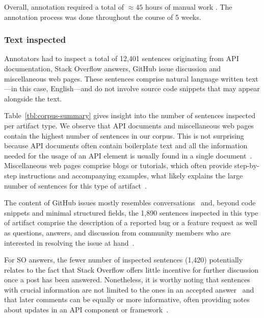 Overall, annotation required a total of $\approx45$ hours of manual work .
The annotation process was done throughout the course of 5 weeks.












\subsubsection{Text inspected}





Annotators had to inspect a total of 12,401 sentences originating from API documentation, Stack Overflow answers, GitHub issue discussion and miscellaneous web pages.
These sentences comprise natural language written text---in this case, English---and do not involve source code snippets that may appear alongside the text.


Table~\ref{tbl:corpus-summary} gives insight into the number of sentences inspected per artifact type. 
We observe that API documents and miscellaneous web pages contain the highest number of sentences in our corpus.
This is not surprising because API documents often contain boilerplate text 
and all the information needed for the usage of an API element is usually found in a single document~\cite{robillard2011field}.
Miscellaneous web pages comprise blogs or tutorials, 
which often provide step-by-step instructions and accompanying examples, 
what likely explains the large number of sentences for this type of artifact~\cite{arya2020, Jiang2016b}.


The content of GitHub issues mostly resembles conversations~\cite{Rastkar2010}
and, beyond code snippets and minimal structured fields, the 
1,890 sentences inspected in this type of artifact comprise the description of a reported bug or a feature request as well as questions, answers, and discussion from  community members who are interested in resolving the issue at hand~\cite{zimmermann2010}.



For SO answers, the fewer number of inspected sentences (1,420) potentially relates to 
the fact that Stack Overflow offers little incentive for further discussion once a post has been answered.
Nonetheless, it is worthy noting that sentences with crucial information 
are not limited to the ones in an accepted answer~\cite{nadi2020}
and that later comments can be equally or more informative,
often providing notes about updates in an API component or framework~\cite{zhang2019so}.




